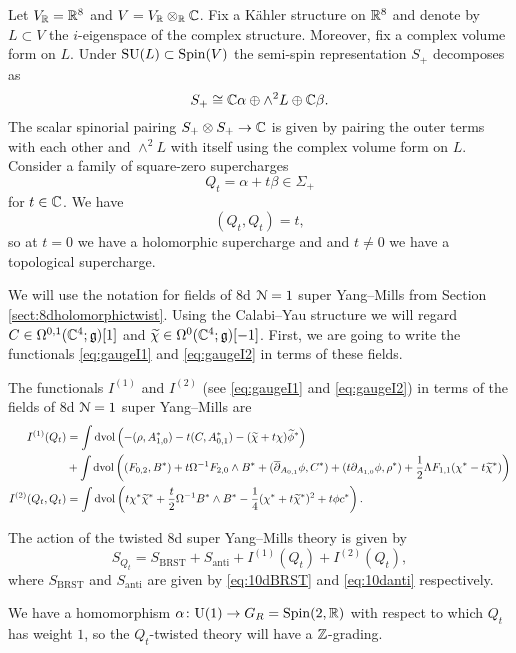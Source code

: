 \documentclass[10pt, oneside]{article}
\renewcommand{\U}{\mathrm{U}}
\begin{document}
Let $V_\mathbb R = \mathbb R^8$ and $V=V_\mathbb R\otimes_\mathbb R\mathbb C$. Fix a K\"ahler structure on $\mathbb R^8$ and denote by $L\subset V$ the $i$-eigenspace of the complex structure. Moreover, fix a complex volume form on $L$. Under $\mathrm{SU}(L)\subset \mathrm{Spin}(V)$ the semi-spin representation $S_+$ decomposes as
\[S_+\cong \mathbb C \alpha\oplus \wedge^2 L\oplus \mathbb C \beta.\]
The scalar spinorial pairing $S_+\otimes S_+\rightarrow \mathbb C$ is given by pairing the outer terms with each other and $\wedge^2L$ with itself using the complex volume form on $L$. Consider a family of square-zero supercharges
\begin{equation}
Q_t = \alpha + t\beta\in\Sigma_+
\label{eq:8dHodgefamily}
\end{equation}
for $t\in\mathbb C$. We have
\[(Q_t, Q_t) = t,\]
so at $t=0$ we have a holomorphic supercharge and and $t\neq 0$ we have a topological supercharge.

We will use the notation for fields of 8d $\mathcal N=1$ super Yang--Mills from Section \ref{sect:8dholomorphictwist}. Using the Calabi--Yau structure we will regard $C\in\Omega^{0, 1}(\mathbb C^4;\mathfrak g)[1]$ and $\widetilde{\chi}\in\Omega^0(\mathbb C^4;\mathfrak g)[-1]$. First, we are going to write the functionals \eqref{eq:gaugeI1} and \eqref{eq:gaugeI2} in terms of these fields.

\begin{prop}
The functionals $I^{(1)}$ and $I^{(2)}$ (see \eqref{eq:gaugeI1} and \eqref{eq:gaugeI2}) in terms of the fields of 8d $\mathcal N=1$ super Yang--Mills are
\begin{align*}
I^{(1)}(Q_t) &= \int \operatorname{dvol}\left(-(\rho, A_{1, 0}^*) - t(C, A_{0, 1}^*) - (\widetilde{\chi} + t\chi)\widetilde{\phi}^*\right) \\
&+ \int\operatorname{dvol}\left((F_{0, 2}, B^*) + t\Omega^{-1} F_{2, 0}\wedge B^* + (\overline{\partial}_{A_{0, 1}}\phi, C^*) + (t\partial_{A_{1, 0}} \phi, \rho^*) + \frac{1}{2}\Lambda F_{1, 1}(\chi^* - t\widetilde{\chi}^*)\right) \\
I^{(2)}(Q_t, Q_t) &= \int \operatorname{dvol} \left(t\chi^*\widetilde{\chi}^* + \frac{t}{2}\Omega^{-1}B^*\wedge B^* -\frac{1}{4}(\chi^* + t\widetilde{\chi}^*)^2 + t\phi c^*\right).
\end{align*}
\end{prop}

The action of the twisted 8d super Yang--Mills theory is given by
\[S_{Q_t} = S_{\mathrm{BRST}} + S_{\mathrm{anti}} + I^{(1)}(Q_t) + I^{(2)}(Q_t),\]
where $S_{\mathrm{BRST}}$ and $S_{\mathrm{anti}}$ are given by \eqref{eq:10dBRST} and \eqref{eq:10danti} respectively.

We have a homomorphism $\alpha\colon \U(1)\rightarrow G_R=\Spin(2, \RR)$ with respect to which $Q_t$ has weight $1$, so the $Q_t$-twisted theory will have a $\mathbb Z$-grading.
\end{document}
